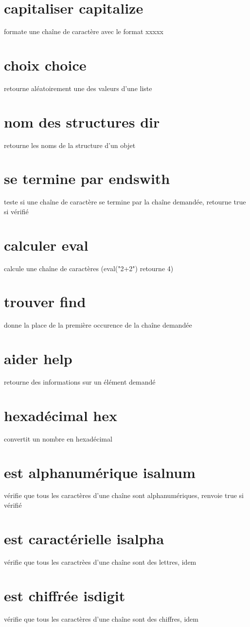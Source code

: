 \documentclass{book}
\begin{document}
\section{capitaliser capitalize }
  formate une chaîne de caractère avec le format xxxxx
\section{choix choice }
  retourne aléatoirement une des valeurs d'une liste
\section{nom des structures dir }
  retourne les noms de la structure d'un objet
\section{se termine par endswith }
  teste si une chaîne de caractère se termine par la chaîne demandée, retourne true si vérifié
\section{calculer eval }
  calcule une chaîne de caractères (eval("2+2") retourne 4)
\section{trouver find }
  donne la place de la première occurence de la chaîne demandée
\section{aider help }
  retourne des informations sur un élément demandé
\section{hexadécimal hex }
  convertit un nombre en hexadécimal
\section{est alphanumérique isalnum }
  vérifie que tous les caractères d'une chaîne sont alphanumériques, renvoie true si vérifié
\section{est caractérielle isalpha }
  vérifie que tous les caractrèes d'une chaîne sont des lettres, idem
\section{est chiffrée isdigit }
  vérifie que tous les caractères d'une chaîne sont des chiffres, idem
\end{document}
